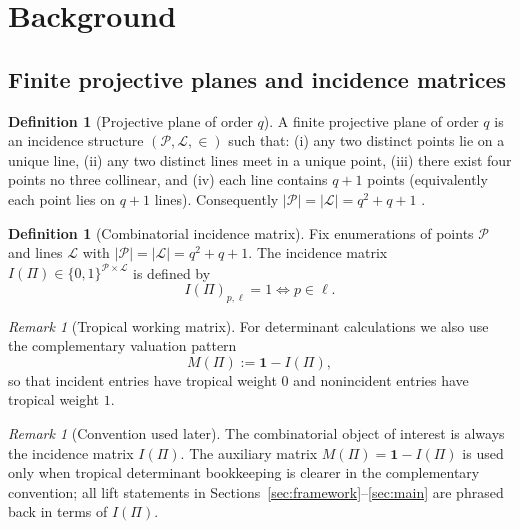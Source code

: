 \documentclass[11pt]{amsart}
\numberwithin{equation}{section}
\theoremstyle{plain}
\theoremstyle{definition}
\newtheorem{definition}[theorem]{Definition}
\theoremstyle{remark}
\newtheorem{remark}[theorem]{Remark}
\begin{document}


\section{Background}
\label{sec:background}


\subsection{Finite projective planes and incidence matrices}
\begin{definition}[Projective plane of order $q$]
A finite projective plane of order $q$ is an incidence structure $(\mathcal{P},\mathcal{L},\in)$ such that:
(i) any two distinct points lie on a unique line, (ii) any two distinct lines meet in a unique point,
(iii) there exist four points no three collinear, and (iv) each line contains $q+1$ points (equivalently each point lies on $q+1$ lines).
Consequently $|\mathcal P|=|\mathcal L|=q^2+q+1$ \cite{dembowski1968,hirschfeld1998}.
\end{definition}

\begin{definition}[Combinatorial incidence matrix]
Fix enumerations of points $\mathcal{P}$ and lines $\mathcal{L}$ with $|\mathcal{P}|=|\mathcal{L}|=q^2+q+1$.
The incidence matrix $I(\Pi)\in\{0,1\}^{\mathcal{P}\times\mathcal{L}}$ is defined by
\[
I(\Pi)_{p,\ell}=1 \iff p\in \ell.
\]
\end{definition}

\begin{remark}[Tropical working matrix]
For determinant calculations we also use the complementary valuation pattern
\[
M(\Pi):=\mathbf 1-I(\Pi),
\]
so that incident entries have tropical weight $0$ and nonincident entries have tropical weight $1$.
\end{remark}

\begin{remark}[Convention used later]
The combinatorial object of interest is always the incidence matrix $I(\Pi)$. The auxiliary matrix $M(\Pi)=\mathbf 1-I(\Pi)$ is used only when tropical determinant bookkeeping is clearer in the complementary convention; all lift statements in Sections~\ref{sec:framework}--\ref{sec:main} are phrased back in terms of $I(\Pi)$.
\end{remark}
\end{document}
